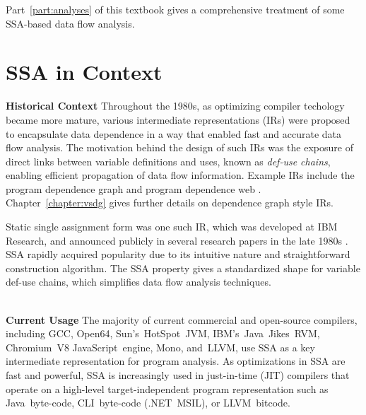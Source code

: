 Part~\ref{part:analyses} of this textbook gives a comprehensive treatment of 
some SSA-based data flow analysis.






\section{SSA in Context}




\textbf{Historical Context }
Throughout the 1980s, as optimizing compiler
techology became more mature, various intermediate
representations (IRs) were proposed to encapsulate data
dependence in a way that enabled fast and accurate
data flow analysis.
The motivation behind the design of
such IRs was the exposure of direct links between variable
definitions and uses, known as \textit{def-use chains},
enabling efficient propagation of data flow information.
Example IRs include the program dependence graph \cite{ferrante87program}
and program dependence web \cite{ottenstein90program}.
Chapter~\ref{chapter:vsdg} gives further details on dependence graph
style IRs.


Static single assignment form was one such IR, 
which was developed at IBM Research, and announced publicly
in several research papers in the late 1980s
\cite{rosen88global,alpern88detecting,cytron89efficient}.
SSA rapidly acquired popularity due to its 
intuitive nature and straightforward
construction algorithm.
The SSA property gives a 
standardized shape for variable def-use chains,
which simplifies data flow analysis techniques.

~\\
\textbf{Current Usage }
The majority of current commercial and open-source compilers, including  GCC, Open64, Sun's~HotSpot~JVM, IBM's~Java~Jikes~RVM, Chromium~V8 JavaScript~engine, Mono, and~LLVM,
use SSA as a key intermediate representation for
program analysis.
As optimizations in SSA are fast and powerful, SSA is increasingly used in
just-in-time (JIT) compilers that operate on a high-level target-independent
program representation such as Java~byte-code, CLI~byte-code (.NET~MSIL), or
LLVM~bitcode.

